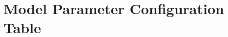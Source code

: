 \documentclass{article}
\begin{document}
\section{Model Parameter Configuration Table}
\label{app:model_config}
\end{document}

